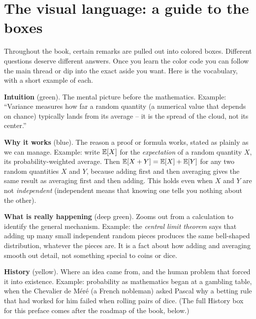 \section*{The visual language: a guide to the boxes}
\label{ch00:visual-language}

Throughout the book, certain remarks are pulled out into colored
boxes. Different questions deserve different answers. Once you learn the color
code you can follow the main thread or dip into the exact aside you want.
Here is the vocabulary, with a short example of each.

\begin{intuitionbox}
\textbf{Intuition} (green). The mental picture before the mathematics. Example:
``Variance measures how far a random quantity (a numerical value that depends on chance) typically lands from its average
-- it is the spread of the cloud, not its center.''
\end{intuitionbox}

\begin{whybox}
\textbf{Why it works} (blue). The reason a proof or formula works, stated as
plainly as we can manage. Example: write $\operatorname{\mathbb{E}}[X]$ for the \emph{expectation} of a
random quantity $X$, its probability-weighted average. Then
$\operatorname{\mathbb{E}}[X+Y]=\operatorname{\mathbb{E}}[X]+\operatorname{\mathbb{E}}[Y]$ for any two random quantities $X$ and $Y$, because
adding first and then averaging gives the same result as averaging first and
then adding. This holds even when $X$ and $Y$ are not \emph{independent}
(independent means that knowing one tells you nothing about the other).
\end{whybox}

\begin{happeningbox}
\textbf{What is really happening} (deep green). Zooms out from a calculation to
identify the general mechanism. Example: the \emph{central limit theorem} says
that adding up many small independent random pieces produces the same
bell-shaped distribution, whatever the pieces are. It is a fact about how
adding and averaging smooth out detail, not something special to coins or dice.
\end{happeningbox}

\noindent
\textbf{History} (yellow). Where an idea came from, and the human problem that
forced it into existence. Example: probability as mathematics began at
a gambling table, when the Chevalier de M\'er\'e (a French nobleman) asked Pascal
why a betting rule that had worked for him failed when rolling
pairs of dice. (The full History box for this preface comes after the
roadmap of the book, below.)

